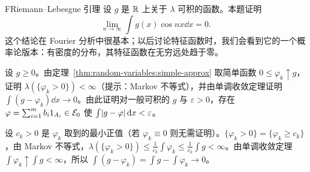 \begin{probleme}{F}{Riemann--Lebesgue 引理}
设 $g$ 是 $\mathbb{R}$ 上关于 $\lambda$ 可积的函数。本题证明
\[
\lim_{n\to\infty}\int g(x)\cos nx\dd x=0 .
\]
这个结论在 Fourier 分析中很基本；以后讨论特征函数时，我们会看到它的一个概率论版本：有密度的分布，其特征函数在无穷远处趋于零。
\begin{questions}
\item 设 $g\geqslant0$。由定理~\ref{thm:random-variables:simple-approx} 取简单函数 $0\leqslant\varphi_k\uparrow g$，证明 $\lambda(\{\varphi_k>0\})<\infty$（提示：Markov 不等式），并由单调收敛定理证明 $\int(g-\varphi_k)\dd x\to0$。由此证明对一般可积的 $g$ 与 $\varepsilon>0$，存在 $\varphi=\sum_{i=1}^mb_i1_{A_i}\in\mathcal{E}_0$ 使 $\int\lvert g-\varphi\rvert\,\mathrm{d} x<\varepsilon$。
\begin{solution}
设 $c_k>0$ 是 $\varphi_k$ 取到的最小正值（若 $\varphi_k\equiv0$ 则无需证明）。$\{\varphi_k>0\}=\{\varphi_k\geqslant c_k\}$，由 Markov 不等式，$\lambda(\{\varphi_k>0\})\leqslant\frac1{c_k}\int\varphi_k\leqslant\frac1{c_k}\int g<\infty$。由单调收敛定理 $\int\varphi_k\uparrow\int g<\infty$，所以 $\int(g-\varphi_k)=\int g-\int\varphi_k\to0$。


\end{solution}
\end{questions}
\end{probleme}
